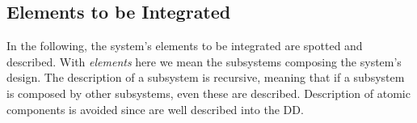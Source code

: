 \subsection{Elements to be Integrated}

In the following, the system's elements to be integrated are spotted and described. With \textit{elements} here we mean the subsystems composing the system's design. The description of a subsystem is recursive, meaning that if a subsystem is composed by other subsystems, even these are described. Description of atomic components is avoided since are well described into the DD.
